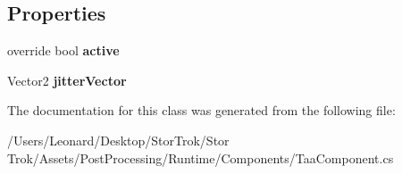 \subsection*{Properties}
\begin{DoxyCompactItemize}
\item 
\mbox{\label{class_unity_engine_1_1_post_processing_1_1_taa_component_aadb855573680151dae4900d12af520b2}} 
override bool {\bfseries active}
\item 
\mbox{\label{class_unity_engine_1_1_post_processing_1_1_taa_component_ad7a44ec209bac50e7f42e10784462019}} 
Vector2 {\bfseries jitter\+Vector}
\end{DoxyCompactItemize}


The documentation for this class was generated from the following file\+:\begin{DoxyCompactItemize}
\item 
/\+Users/\+Leonard/\+Desktop/\+Stor\+Trok/\+Stor Trok/\+Assets/\+Post\+Processing/\+Runtime/\+Components/Taa\+Component.\+cs\end{DoxyCompactItemize}
